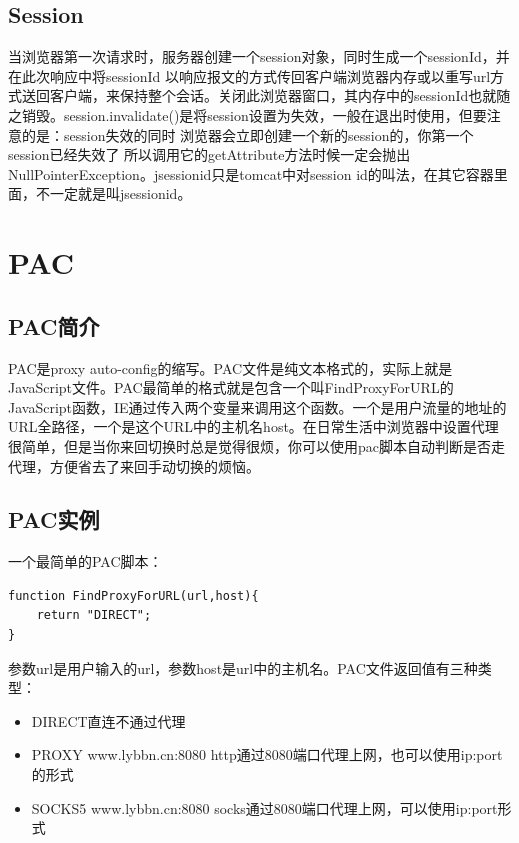 \documentclass[letter]{book}
\begin{document}
\subsection{Session}

当浏览器第一次请求时，服务器创建一个session对象，同时生成一个sessionId，并在此次响应中将sessionId 以响应报文的方式传回客户端浏览器内存或以重写url方式送回客户端，来保持整个会话。关闭此浏览器窗口，其内存中的sessionId也就随之销毁。session.invalidate()是将session设置为失效，一般在退出时使用，但要注意的是：session失效的同时 浏览器会立即创建一个新的session的，你第一个session已经失效了 所以调用它的getAttribute方法时候一定会抛出NullPointerException。jsessionid只是tomcat中对session id的叫法，在其它容器里面，不一定就是叫jsessionid。


\section{PAC}

\subsection{PAC简介}

PAC是proxy auto-config的缩写。PAC文件是纯文本格式的，实际上就是JavaScript文件。PAC最简单的格式就是包含一个叫FindProxyForURL的JavaScript函数，IE通过传入两个变量来调用这个函数。一个是用户流量的地址的URL全路径，一个是这个URL中的主机名host。在日常生活中浏览器中设置代理很简单，但是当你来回切换时总是觉得很烦，你可以使用pac脚本自动判断是否走代理，方便省去了来回手动切换的烦恼。

\subsection{PAC实例}

一个最简单的PAC脚本：

\begin{lstlisting}[language=VBScript]
function FindProxyForURL(url,host){
	return "DIRECT";
}
\end{lstlisting}

参数url是用户输入的url，参数host是url中的主机名。PAC文件返回值有三种类型：

\begin{itemize}
	\item{DIRECT直连不通过代理}
	\item{PROXY www.lybbn.cn:8080 http通过8080端口代理上网，也可以使用ip:port的形式}
	\item{SOCKS5 www.lybbn.cn:8080 socks通过8080端口代理上网，可以使用ip:port形式}
\end{itemize}
\end{document}
